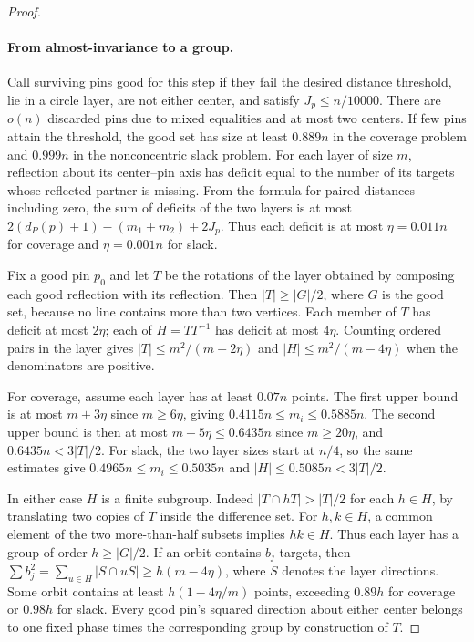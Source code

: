 \begin{proof}
\paragraph{From almost-invariance to a group.}
Call surviving pins good for this step if they fail the desired distance
threshold, lie in a circle layer, are not either center, and satisfy
\(J_p\le n/10000\). There are \(o(n)\) discarded pins due to mixed
equalities and at most two centers. If few pins attain the threshold,
the good set has size at least \(0.889n\) in the coverage problem and
\(0.999n\) in the nonconcentric slack problem.
For each layer of size \(m\), reflection about its center--pin axis has
deficit equal to the number of its targets whose reflected partner is
missing. From the formula for paired distances including zero, the sum
of deficits of the two layers is at most
\(2(d_P(p)+1)-(m_1+m_2)+2J_p\). Thus each deficit is at most
\(\eta=0.011n\) for coverage and \(\eta=0.001n\) for slack.

Fix a good pin \(p_0\) and let \(T\) be the rotations of the layer obtained
by composing each good reflection with its reflection. Then
\(|T|\ge |G|/2\), where \(G\) is the good set, because no line contains
more than two vertices. Each member of \(T\) has deficit at most \(2\eta\);
each of \(H=TT^{-1}\) has deficit at most \(4\eta\). Counting ordered pairs
in the layer gives \(|T|\le m^2/(m-2\eta)\) and \(|H|\le m^2/(m-4\eta)\)
when the denominators are positive.

For coverage, assume each layer has at least \(0.07n\) points. The first
upper bound is at most \(m+3\eta\) since \(m\ge6\eta\), giving
\(0.4115n\le m_i\le0.5885n\). The second upper bound is then at most
\(m+5\eta\le0.6435n\) since \(m\ge20\eta\), and \(0.6435n<3|T|/2\).
For slack, the two layer sizes start at \(n/4\), so the same estimates
give \(0.4965n\le m_i\le0.5035n\) and \(|H|\le0.5085n<3|T|/2\).

In either case \(H\) is a finite subgroup. Indeed \(|T\cap hT|>|T|/2\)
for each \(h\in H\), by translating two copies of \(T\) inside the
difference set. For \(h,k\in H\), a common element of the two more-than-half
subsets implies \(hk\in H\). Thus each layer has a group of order
\(h\ge |G|/2\). If an orbit contains \(b_j\) targets, then
\(\sum b_j^2=\sum_{u\in H}|S\cap uS|\ge h(m-4\eta)\), where \(S\) denotes
the layer directions. Some orbit contains at least \(h(1-4\eta/m)\) points,
exceeding \(0.89h\) for coverage or \(0.98h\) for slack. Every good pin's
squared direction about either center belongs to one fixed phase times
the corresponding group by construction of \(T\).


\end{proof}
